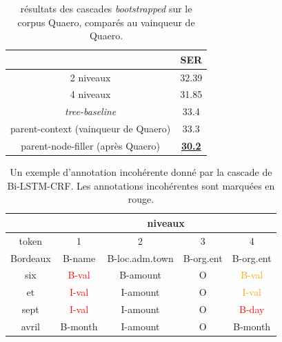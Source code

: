\documentclass[12pt,a4paper,times,twoside,openright]{report}
\begin{document}
\begin{table}[ht!]
\centering
\begin{tabular}{|c|c|}
\cline{2-2}
\multicolumn{1}{c|}{} & SER \\
\hline
2 niveaux   & 32.39       \\
4 niveaux   & 31.85       \\
\hline
\citet{dinarelli2012} \textit{tree-baseline} & 33.4 \\
\citet{dinarelli2012} parent-context (vainqueur de Quaero) & 33.3 \\
\citet{dinarelli2012} parent-node-filler (après Quaero) & \textbf{\underline{30.2}} \\
\hline
\end{tabular}
\caption{résultats des cascades \textit{bootstrapped} sur le corpus Quaero, comparés au vainqueur de Quaero.}
\label{tab:bootstrap-results}
\end{table}

\begin{table}[ht!]
\centering
\begin{tabular}{|c|c|c|c|c|}
\cline{2-5}
\multicolumn{1}{c}{} & \multicolumn{4}{|c|}{niveaux} \\
\hline
token & 1 & 2 & 3 & 4 \\
\hline
Bordeaux & B-name & B-loc.adm.town & B-org.ent & B-org.ent \\
six & \textcolor{red}{B-val} & B-amount & O & \textcolor{orange}{B-val} \\
et & \textcolor{red}{I-val} & I-amount & O & \textcolor{orange}{I-val} \\
sept & \textcolor{red}{I-val} & I-amount & O & \textcolor{red}{B-day} \\
avril & B-month & I-amount & O & B-month \\
\hline
\end{tabular}
\caption{Un exemple d'annotation incohérente donné par la cascade de Bi-LSTM-CRF. Les annotations incohérentes sont marquées en rouge.}
\label{tab:incoherent-annotation}
\end{table}
\end{document}
